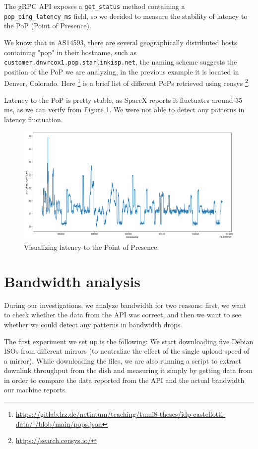 \documentclass[IN,11pt,twoside,openright,idp,english]{tumthesis}
\begin{document}
The gRPC API exposes a \texttt{get\_status} method containing a \texttt{pop\_ping\_latency\_ms} field, so we decided to measure the stability of latency to the PoP (Point of Presence). 

We know that in AS14593, there are several geographically distributed hosts containing "pop" in their hostname, such as \texttt{customer.dnvrcox1.pop.starlinkisp.net}, the naming scheme suggests the position of the PoP we are analyzing, in the previous example it is located in Denver, Colorado. Here \footnote{\url{https://gitlab.lrz.de/netintum/teaching/tumi8-theses/idp-castellotti-data/-/blob/main/pops.json}} is a brief list of different PoPs retrieved using censys \footnote{\url{https://search.censys.io/}}.

Latency to the PoP is pretty stable, as SpaceX reports it fluctuates around 35 ms, as we can verify from Figure \ref{fig:vis-latency}. We were not able to detect any patterns in latency fluctuation.

\begin{figure}
    \centering
    \includegraphics[width=1\columnwidth]{img/latency.png}
    \caption{Visualizing latency to the Point of Presence.}
    \label{fig:vis-latency}
\end{figure}

\section{Bandwidth analysis}

During our investigations, we analyze bandwidth for two reasons: first, we want to check whether the data from the API was correct, and then we want to see whether we could detect any patterns in bandwidth drops.

The first experiment we set up is the following: We start downloading five Debian ISOs from different mirrors (to neutralize the effect of the single upload speed of a mirror). While downloading the files, we are also running a script to extract downlink throughput from the dish and measuring it simply by getting data from  in order to compare the data reported from the API and the actual bandwidth our machine reports.
\end{document}
